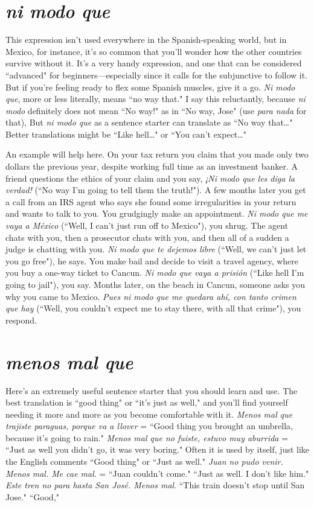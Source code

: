 \section{\emph{ni modo que}}

This expression isn't used everywhere in the Spanish-speaking
world, but in Mexico, for instance, it's so common that you'll wonder
how the other countries survive without it. It's a very handy expression, and one that can be considered ``advanced" for beginners---especially since it calls for the subjunctive to follow it. But if you're feeling
ready to flex some Spanish muscles, give it a go. \emph{Ni modo que}, more or
less literally, means ``no way that." I say this reluctantly, because \emph{ni
	modo} definitely does not mean ``No way!" as in ``No way, Jose" (use
\emph{para nada} for that), But \emph{ni modo que} as a sentence starter can translate as ``No way that\ldots{}" Better translations might be ``Like hell\ldots{}"
or ``You can't expect\ldots{}"

An example will help here. On your tax return you claim that
you made only two dollars the previous year, despite working full time
as an investment banker. A friend questions the ethics of your claim
and you say, \emph{¡Ni modo que les diga la verdad!} (``No way I'm going to
tell them the truth!"). A few months later you get a call from an IRS
agent who says she found some irregularities in your return and wants
to talk to you. You grudgingly make an appointment. \emph{Ni modo que me
	vaya a México} (``Well, I can't just run off to Mexico"), you shrug. The
agent chats with you, then a prosecutor chats with you, and then all of
a sudden a judge is chatting with you. \emph{Ni modo que te dejemos libre}
(``Well, we can't just let you go free"), he says. You make bail and decide to visit a travel agency, where you buy a one-way ticket to Cancun. \emph{Ni modo que vaya a prisión} (``Like hell I'm going to jail"), you
say. Months later, on the beach in Cancun, someone asks you why you
came to Mexico. \emph{Pues ni modo que me quedara ahí, con tanto crimen
	que hay} (``Well, you couldn't expect me to stay there, with all that
crime"), you respond.

\section{\emph{menos mal que}}

Here's an extremely useful sentence starter that you should
learn and use. The best translation is ``good thing" or ``it's just as
well," and you'll find yourself needing it more and more as you become
comfortable with it. \emph{Menos mal que trajiste paraguas, porque va a
	llover} = ``Good thing you brought an umbrella, because it's going to
rain." \emph{Menos mal que no fuiste, estuvo muy aburrida} = ``Just as well
you didn't go, it was very boring." Often it is used by itself, just like
the English comments ``Good thing" or ``Just as well." \emph{Juan no pudo
	venir. Menos mal. Me cae mal}. = ``Juan couldn't come." ``Just as well.
I don't like him." \emph{Este tren no para hasta San José. Menos mal}.
``This train doesn't stop until San Jose." ``Good,"

